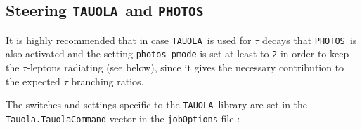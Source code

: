 \documentclass[a4paper,12pt]{article}
\newcommand{\tauola}{{\tt TAUOLA }}
\newcommand{\photos}{{\tt PHOTOS }}
\begin{document}
\clearpage
\boldmath
\subsection{Steering \tauola and \photos \label{s:steering}} 
\unboldmath

It is highly recommended that in case \tauola is used for $\tau$ decays that
\photos is also activated and the setting {\tt photos pmode} is set at least to {\tt 2}
in order to keep the $\tau$-leptons radiating (see below), since it gives 
the necessary contribution to the expected $\tau$ branching ratios.

\vspace{0.2cm}\noindent
The switches and settings specific to the \tauola library are set in the 
{\tt Tauola.TauolaCommand} vector in the {\tt jobOptions} file :
\end{document}
